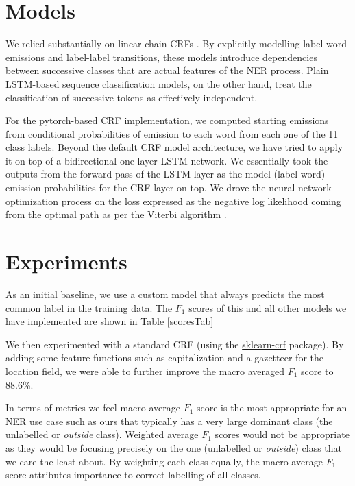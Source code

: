 \documentclass[11pt]{article}
\begin{document}
\section{Models}
We relied substantially on linear-chain CRFs \citep{laffertyCrf, mccallum-li-2003-early, MAL-013}. By explicitly modelling label-word emissions and label-label transitions, these models introduce dependencies between successive classes that are actual features of the NER process. Plain LSTM-based sequence classification models, on the other hand, treat the classification of successive tokens as effectively independent.

For the pytorch-based CRF implementation, we computed starting emissions from conditional probabilities of emission to each word from each one of the 11 class labels. Beyond the default CRF model architecture, we have tried to apply it on top of a bidirectional one-layer LSTM network. We essentially took the outputs from the forward-pass of the LSTM layer as the model (label-word) emission probabilities for the CRF layer on top. We drove the neural-network optimization process on the loss expressed as the negative log likelihood coming from the optimal path as per the Viterbi algorithm \citep{forney1973viterbi}.

\section{Experiments}
As an initial baseline, we use a custom model that always predicts the most common label in the training data. The $F_1$ scores of this and all other models we have implemented are shown in Table \ref{scoresTab}

We then experimented with a standard CRF (using the \href{https://sklearn-crfsuite.readthedocs.io/en/latest/}{sklearn-crf} package). By adding some feature functions such as capitalization and a gazetteer for the location field, we were able to further improve the macro averaged $F_1$ score to 88.6\%.

In terms of metrics we feel macro average $F_1$ score is the most appropriate for an NER use case such as ours that typically has a very large dominant class (the unlabelled or \emph{outside} class). Weighted average $F_1$ scores would not be appropriate as they would be focusing precisely on the one (unlabelled or \emph{outside}) class that we care the least about. By weighting each class equally, the macro average $F_1$ score attributes importance to correct labelling of all classes.
\end{document}
